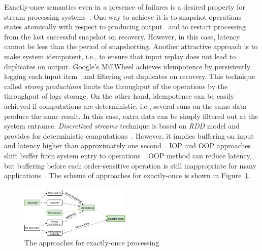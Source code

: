 \label {fs-short-intro}


Exactly-once semantics even in a presence of failures is a desired property for stream processing systems~\cite{Akidau:2013:MFS:2536222.2536229}. One way to achieve it is to snapshot operations states atomically with respect to producing output~\cite{Carbone:2017:SMA:3137765.3137777} and to restart processing from the last successful snapshot on recovery. However, in this case, latency cannot be less than the period of snapshotting. Another attractive approach is to make system idempotent, i.e., to ensure that input replay does not lead to duplicates on output. Google's MillWheel achieves idempotence by persistently logging each input item~\cite{Akidau:2013:MFS:2536222.2536229} and filtering out duplicates on recovery. This technique called {\em strong productions} limits the throughput of the operations by the throughput of logs storage. On the other hand, idempotence can be easily achieved if computations are deterministic, i.e., several runs on the same data produce the same result. In this case, extra data can be simply filtered out at the system entrance. {\em Discretized streams} technique is based on {\em RDD} model and provides for deterministic computations~\cite{Zaharia:2012:DSE:2342763.2342773}. However, it implies buffering on input and latency higher than approximately one second~\cite{Qian:2013:TRS:2465351.2465353}. IOP and OOP approaches shift buffer from system entry to operations~\cite{Li:2008:OPN:1453856.1453890}. OOP method can reduce latency, but buffering before each order-sensitive operation is still inappropriate for many applications~\cite{Zacheilas:2017:MDS:3093742.3093921}. The scheme of approaches for exactly-once is shown in Figure~\ref{approaches}.

\begin{figure}[ht]
  \centering
  \includegraphics[width=0.47\textwidth]{pics/intro-approaches}
  \caption{The approaches for exactly-once processing}
  \label {approaches}
\end{figure}

